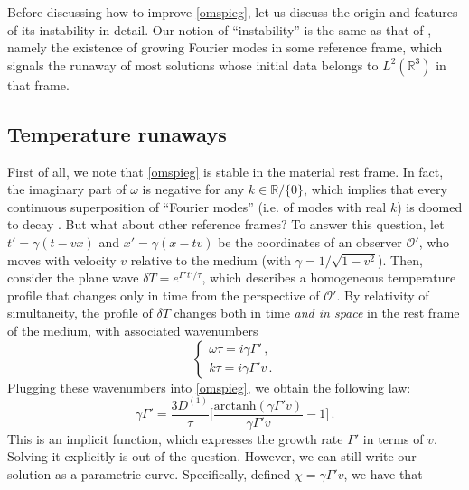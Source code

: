 \documentclass[a4paper, amsfonts, amssymb, amsmath, reprint, showkeys, nofootinbib, twoside,notitlepage,onecolumn]{revtex4-2}
\theoremstyle{definition}
\theoremstyle{theorem}
\theoremstyle{corollary}
\begin{document}
Before discussing how to improve \eqref{omspieg}, let us discuss the origin and features of its instability in detail. Our notion of ``instability'' is the same as that of \citet{Hiscock_Insatibility_first_order}, namely the existence of growing Fourier modes in some reference frame, which signals the runaway of most solutions whose initial data belongs to $L^2(\mathbb{R}^3)$ in that frame.

\vspace{-0.4cm}
\subsection{Temperature runaways}\label{runaways}
\vspace{-0.2cm}

First of all, we note that \eqref{omspieg} is stable in the material rest frame. In fact,
the imaginary part of $\omega$ is negative for any $k\in \mathbb{R}/\{0\}$, which implies that every continuous superposition of ``Fourier modes'' (i.e. of modes with real $k$) is doomed to decay \cite{Hiscock_Insatibility_first_order}. But what about other reference frames? To answer this question, let $t'=\gamma(t{-}vx)$ and $x'=\gamma(x{-}tv)$ be the coordinates of an observer $\mathcal{O}'$, who moves with velocity $v$ relative to the medium (with $\gamma=1/\sqrt{1{-}v^2}$). Then, consider the plane wave $\delta T=e^{\Gamma't'/\tau}$, which describes a homogeneous temperature profile that changes only in time from the perspective of $\mathcal{O}'$. By relativity of simultaneity, the profile of $\delta T$ changes both in time \textit{and in space} in the rest frame of the medium, with associated wavenumbers
\vspace{-0.1cm}
\begin{equation}\label{hjhjhj}
\begin{cases}
\omega\tau =i\gamma\Gamma' \, ,\\
k\tau=i\gamma\Gamma' v\, .
\end{cases}
\end{equation}
Plugging these wavenumbers into \eqref{omspieg}, we obtain the following law:
\vspace{-0.1cm}
\begin{equation}
\gamma\Gamma'=  \dfrac{3D^{(1)}}{\tau} \bigg[\dfrac{\text{arctanh}(\gamma\Gamma'v)}{\gamma\Gamma'v} -1\bigg]\, .
\end{equation}
This is an implicit function, which expresses the growth rate $\Gamma'$ in terms of $v$. Solving it explicitly is out of the question. However, we can still write our solution as a parametric curve. Specifically, defined $\chi=\gamma \Gamma' v$, we have that
\end{document}
